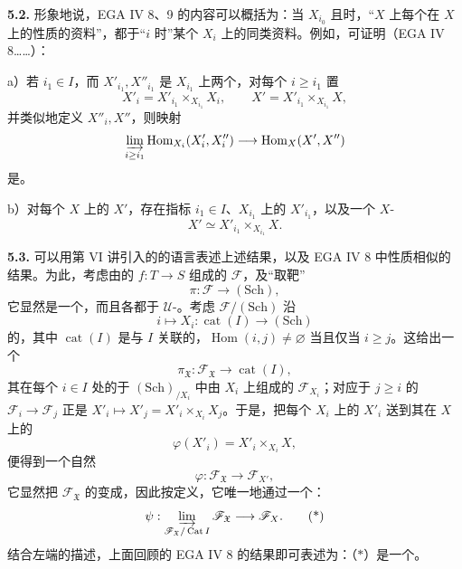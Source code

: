 \textbf{5.2.} 形象地说，EGA IV 8、9 的内容可以概括为：当 $X_{i_0}$ 且时，“$X$ 上每个在 $X$ 上的性质的资料”，都于“$i$ 时”某个 $X_i$ 上的同类资料。例如，可证明（EGA IV 8……）：

a）若 $i_1\in I$，而 $X'_{i_1},X''_{i_1}$ 是 $X_{i_1}$ 上两个，对每个 $i\geq i_1$ 置
\[
 X'_i=X'_{i_1}\times_{X_{i_1}}X_i,\qquad
 X'=X'_{i_1}\times_{X_{i_1}}X,
\]
并类似地定义 $X''_i,X''$，则映射
\[
 \varinjlim_{i\geq i_1}\operatorname{Hom}_{X_i}(X'_i,X''_i)
 \longrightarrow\operatorname{Hom}_X(X',X'')
\]
是。

b）对每个 $X$ 上的 $X'$，存在指标 $i_1\in I$、$X_{i_1}$ 上的 $X'_{i_1}$，以及一个 $X$-
\[
 X'\simeq X'_{i_1}\times_{X_{i_1}}X.
\]

\textbf{5.3.} 可以用第 VI 讲引入的的语言表述上述结果，以及 EGA IV 8 中性质相似的结果。为此，考虑由的 $f:T\to S$ 组成的 $\mathscr F$，及“取靶”
\[
 \pi:\mathscr F\longrightarrow(\mathrm{Sch}),
\]
它显然是一个，而且各都于 $\mathcal U$-。考虑 $\mathscr F/(\mathrm{Sch})$ 沿
\[
 i\longmapsto X_i:\operatorname{cat}(I)\longrightarrow(\mathrm{Sch})
\]
的，其中 $\operatorname{cat}(I)$ 是与 $I$ 关联的，$\operatorname{Hom}(i,j)\ne\varnothing$ 当且仅当 $i\geq j$。这给出一个
\[
 \pi_{\mathfrak X}:\mathscr F_{\mathfrak X}\longrightarrow\operatorname{cat}(I),
\]
其在每个 $i\in I$ 处的于 $(\mathrm{Sch})_{/X_i}$ 中由 $X_i$ 上组成的 $\mathscr F_{X_i}$；对应于 $j\geq i$ 的 $\mathscr F_i\to\mathscr F_j$ 正是 $X'_i\mapsto X'_j=X'_i\times_{X_i}X_j$。于是，把每个 $X_i$ 上的 $X'_i$ 送到其在 $X$ 上的
\[
 \varphi(X'_i)=X'_i\times_{X_i}X,
\]
便得到一个自然
\[
 \varphi:\mathscr F_{\mathfrak X}\longrightarrow\mathscr F_{X'},
\]
它显然把 $\mathscr F_{\mathfrak X}$ 的变成，因此按定义，它唯一地通过一个：
\[
 \psi:\varinjlim_{\mathscr F_{\mathfrak X}/\operatorname{Cat}I}\mathscr F_{\mathfrak X}
 \longrightarrow\mathscr F_X.\tag{*}
\]
结合左端的描述，上面回顾的 EGA IV 8 的结果即可表述为：（$*$）是一个。

